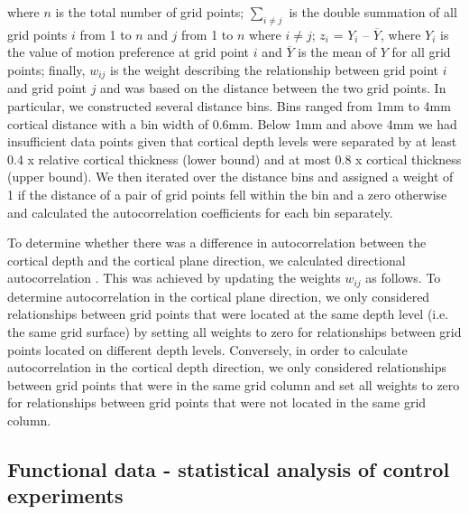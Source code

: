 where $n$ is the total number of grid points; $\sum\limits_{i \neq j}$ is the double summation of all grid points $i$ from 1 to $n$ and $j$ from 1 to $n$ where $i \neq j$; $z_i$ = $Y_i$ – $\overline{Y}$, where $Y_i$ is the value of motion preference at grid point $i$ and $\overline{Y}$ is the mean of $Y$ for all grid points; finally, $w_{ij}$ is the weight describing the relationship between grid point $i$ and grid point $j$ and was based on the distance between the two grid points. In particular, we constructed several distance bins. Bins ranged from 1mm to 4mm cortical distance with a bin width of 0.6mm. Below 1mm and above 4mm we had insufficient data points given that cortical depth levels were separated by at least 0.4 x relative cortical thickness (lower bound) and at most 0.8 x cortical thickness (upper bound). We then iterated over the distance bins and assigned a weight of 1 if the distance of a pair of grid points fell within the bin and a zero otherwise and calculated the autocorrelation coefficients for each bin separately.

To determine whether there was a difference in autocorrelation between the cortical depth and the cortical plane direction, we calculated directional autocorrelation \parencite{Oden1986, Rosenberg2010}. This was achieved by updating the weights $w_{ij}$ as follows. To determine autocorrelation in the cortical plane direction, we only considered relationships between grid points that were located at the same depth level (i.e. the same grid surface) by setting all weights to zero for relationships between grid points located on different depth levels. Conversely, in order to calculate autocorrelation in the cortical depth direction, we only considered relationships between grid points that were in the same grid column and set all weights to zero for relationships between grid points that were not located in the same grid column.

\subsection{Functional data - statistical analysis of control experiments}
